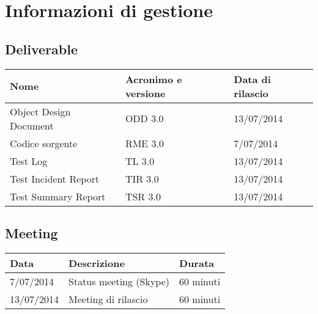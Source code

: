 \chapter{Informazioni di gestione}
\section{Deliverable}

\begin{table}[ht]
  \centering
  \begin{tabular}{|p{5cm}|p{3cm}|p{4cm}|}
    \hline
    \rowcolor{Gray}\textbf{Nome}	& \textbf{Acronimo e versione}			& \textbf{Data di rilascio}\\
    \hline
    Object Design Document		& ODD 3.0					& 13/07/2014		   \\
    \hline
    Codice sorgente			& RME 3.0					& 7/07/2014		   \\
    \hline
    Test Log				& TL 3.0					& 13/07/2014		   \\
    \hline
    Test Incident Report		& TIR 3.0					& 13/07/2014		   \\
    \hline
    Test Summary Report			& TSR 3.0					& 13/07/2014		   \\
    \hline
  \end{tabular}
\end{table}

\section{Meeting}

\begin{table}[ht]
  \centering
  \begin{tabular}{|p{3cm}|p{5cm}|p{3cm}|}
  \hline
  \rowcolor{Gray}\textbf{Data}		& \textbf{Descrizione}			& \textbf{Durata}			\\
  \hline
  7/07/2014				& Status meeting (Skype)		& 60 minuti				\\
  \hline
  13/07/2014				& Meeting di rilascio			& 60 minuti				\\
  \hline
  \end{tabular}
\end{table}
